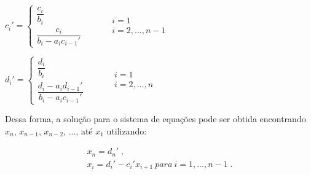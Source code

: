 \begin{center}
	\begin{math}
		c_i' = 
		\left\{
    		\begin{array}{l}
      			\dfrac{c_i}{b_i}  \\
				\dfrac{c_i}{b_i - a_i c_{i-1}'}
			\end{array}
    		\begin{array}{l}
      		\qquad \\
			\qquad \\
			\qquad	   
    		\end{array}
    		\begin{array}{l}
    			i = 1 \\
      			i = 2, ... , n-1
    		\end{array}
		\right.	
	\end{math}
\end{center} 
\begin{center}
	\begin{math}
		d_i' = 
		\left\{
    		\begin{array}{l}
      			\dfrac{d_i}{b_i}  \\
				\dfrac{d_i - a_i d_{i-1}'}{b_i - a_i c_{i-1}'}
			\end{array}
    		\begin{array}{l}
      			\qquad \\
				\qquad \\
				\qquad	   
    		\end{array}
    		\begin{array}{l}
    			i = 1 \\
      			i = 2, ... , n
    		\end{array}
		\right.
	\end{math}
\end{center} 

Dessa forma, a solução para o sistema de equações pode ser obtida encontrando $x_n$, $x_{n-1}$, $x_{n-2}$, ..., até $x_1$ utilizando:

\begin{gather*}
	x_n = d_n' \;,\\
	x_i = d_i' - c_i' x_{i+1} \ para \ i = 1, ..., n-1 \;.
\end{gather*}